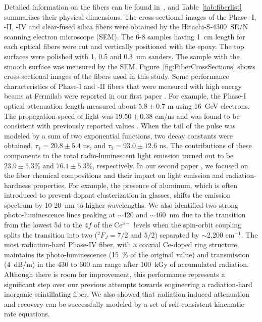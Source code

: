 \documentclass[a4paper,11pt]{article}
\begin{document}
Detailed information on the fibers can be found in~\cite{JINSTPaper}, and Table~\ref{tab:fiberlist} summarizes their physical dimensions. The cross-sectional images of the Phase -I, -II, -IV and clear-fused silica fibers were obtained by the Hitachi-S-4300~SE/N scanning electron microscope (SEM). The 6-8 samples having 1~cm length for each optical fibers were cut and vertically positioned with the epoxy. The top surfaces were polished with 1, 0.5 and 0.3~um sanders. The sample with the smooth surface was measured by the SEM. Figure~\ref{fig:FiberCrossSections} shows cross-sectional images of the fibers used in this study.  Some performance characteristics of Phase-I and -II fibers that were measured with high energy beams at Fermilab were reported in our first paper \cite{JINSTPaper}.  For example, the Phase-I optical attenuation length measured about $5.8\pm0.7$ m using 16~GeV  electrons.  The propagation speed of light was $19.50\pm0.38$ cm/ns and was found to be consistent with previously reported values \cite{Goro,Akch97}.  When the tail of the pulse was modeled by a sum of two exponential functions, two decay constants were obtained, $\tau_1= 20.8\pm5.4$ ns, and $\tau_2= 93.0\pm12.6$ ns.  The contributions of these components to the total radio-luminescent light emission turned out to be $23.9\pm5.3$\% and $76.1\pm5.3$\%, respectively.  In our second paper \cite{JINSTPaper2}, we focused on the fiber chemical compositions and their impact on light emission and radiation-hardness properties.  For example, the presence of aluminum, which is often introduced to prevent dopant clusterization in glasses, shifts the emission spectrum by 10-20~nm to higher wavelengths.  We also identified two strong photo-luminescence lines peaking at $\sim$420 and $\sim$460~nm due to the transition from the lowest 5$d$ to the 4$f$ of the Ce$^{3+}$ levels when the spin-orbit coupling splits the transition into two ($^2F_{J}=7/2$ and $5/2$) separated by $\sim$2,200 cm$^{-1}$. The most radiation-hard Phase-IV fiber, with a coaxial Ce-doped ring structure, maintains its photo-luminescence (15~\% of the original value) and transmission (4~dB/m) in the 430 to 600 nm range after 100~kGy of accumulated radiation. Although there is room for improvement, this performance represents a significant step over our previous attempts towards engineering a radiation-hard inorganic scintillating  fiber.  We also showed that radiation induced attenuation and recovery can be successfully modeled by a set of self-consistent kinematic rate equations.
\end{document}
